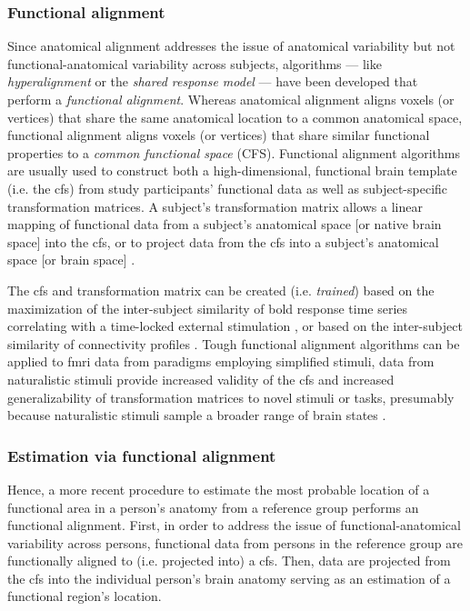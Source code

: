 \subsubsection{Functional alignment}

%
Since anatomical alignment addresses the issue of anatomical variability but not
functional-anatomical variability across subjects, algorithms --- like
\textit{hyperalignment} \citep{haxby2011common, guntupalli2016model} or the
\textit{shared response model} \citep{chen2015reduced, zhang2016searchlight} ---
have been developed that perform a \textit{functional alignment}.
%
Whereas anatomical alignment aligns voxels (or vertices) that share the same
anatomical location to a common anatomical space, functional alignment aligns
voxels (or vertices) that share similar functional properties to
a \textit{common functional space} (CFS).
%
Functional alignment algorithms are usually used to construct both a
high-dimensional, functional brain template (i.e. the \ac{cfs}) from study
participants' functional data as well as subject-specific transformation
matrices.
%
A subject's transformation matrix allows a linear mapping of functional data
from a subject's anatomical space [or native brain space] into the \ac{cfs}, or
to project data from the \ac{cfs} into a subject's anatomical space [or brain
space] \citep{haxby2020hyperalignment}.

%
The \ac{cfs} and transformation matrix can be created (i.e.  \textit{trained})
based on the maximization of the inter-subject similarity of \ac{bold} response
time series correlating with a time-locked external stimulation
\citep{haxby2011common, chen2015reduced, sabuncu2010function}, or based on the
inter-subject similarity of connectivity profiles \citep{feilong2018reliable,
guntupalli2018computational, nastase2019leveraging}.
%
Tough functional alignment algorithms can be applied to \ac{fmri} data from
paradigms employing simplified stimuli, data from naturalistic stimuli provide
increased validity of the \ac{cfs} and increased generalizability of
transformation matrices to novel stimuli or tasks, presumably because
naturalistic stimuli sample a broader range of brain states
\citep{haxby2011common, guntupalli2016model}.


\subsubsection{Estimation via functional alignment}
%
Hence, a more recent procedure \citep[e.g., ][]{jiahui2020predicting,
guntupalli2016model, haxby2011common} to estimate the most probable location of
a functional area in a person's anatomy from a reference group performs an
functional alignment.
First, in order to address the issue of functional-anatomical variability across
persons, functional data from persons in the reference group are functionally
aligned to (i.e. projected into) a \ac{cfs}.
%
Then, data are projected from the \ac{cfs} into the individual person's brain
anatomy serving as an estimation of a functional region's location.

